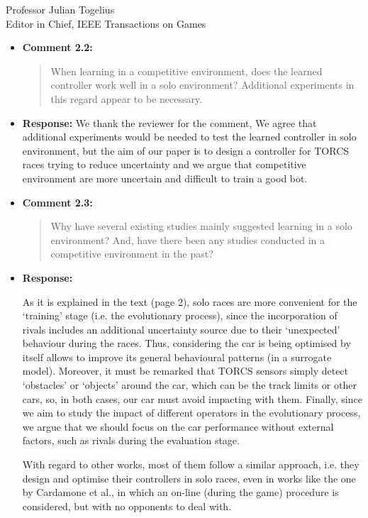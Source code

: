\documentclass[10pt]{letter} %
\begin{document}
\begin{letter}{Professor Julian Togelius \\ Editor in Chief, IEEE Transactions on Games}
\begin{enumerate}
\begin{itemize}
\begin{itemize}
                        that is indeed a good suggestion for future
                        work, for which we are really grateful. For
                        the time being, that introduction of another
                        variable in the problem was not considered for
                        this paper.
		\item {\bf Comment 2.2:}
		\begin{quote}
When learning in a competitive environment, does the learned controller work well in a solo environment? Additional experiments in this regard appear to be necessary.
			\end{quote}	
		\item {\bf Response:} 
		We thank the reviewer for the comment, We agree that additional experiments would be needed to test the learned controller in solo environment, but the aim of our paper is to design a controller for TORCS races trying to reduce uncertainty and we argue that competitive environment are more uncertain and difficult to train a good bot.
		
		\item {\bf Comment 2.3:}
		\begin{quote}
Why have several existing studies mainly suggested learning in a solo environment? And, have there been any studies conducted in a competitive environment in the past?
			\end{quote}	
		\item {\bf Response:} 
		
	As it is explained in the text (page 2), solo races are more convenient for the `training' stage (i.e. the evolutionary process), since the incorporation of rivals includes an additional uncertainty source due to their `unexpected' behaviour during the races. Thus, considering the car is being optimised by itself allows to improve its general behavioural patterns (in a surrogate model). Moreover, it must be remarked that TORCS sensors simply detect `obstacles' or `objects' around the car, which can be the track limits or other cars, so, in both cases, our car must avoid impacting with them.
Finally, since we aim to study the impact of different operators in the evolutionary process, we argue that we should focus on the car performance without external factors, such as rivals during the evaluation stage.

With regard to other works, most of them follow a similar approach, i.e. they design and optimise their controllers in solo races, even in works like the one by Cardamone et al., in which an on-line (during the game) procedure is considered, but with no opponents to deal with.


\end{itemize}
\end{itemize}
\end{enumerate}
\end{letter}
\end{document}
